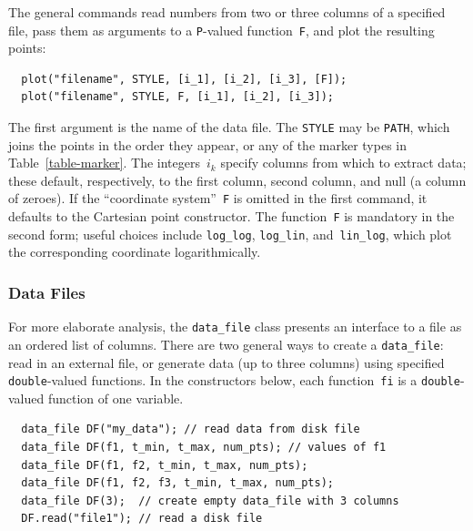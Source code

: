\documentclass[12pt,letterpaper]{book}
\newcommand{\code}[1]{\texttt{#1}}
\newcommand{\teximath}[1]{$#1$}
\newcommand{\findex}[1]{\ignorespaces}
\begin{document}
The general commands read numbers from two or three columns of a
specified file, pass them as arguments to a \code{P}-valued
function~\code{F}, and plot the resulting points:
\findex{plot}
\begin{verbatim}
  plot("filename", STYLE, [i_1], [i_2], [i_3], [F]);
  plot("filename", STYLE, F, [i_1], [i_2], [i_3]);
\end{verbatim}
The first argument is the name of the data file. The \code{STYLE} may
be \code{PATH}, which joins the points in the order they appear, or
any of the marker types in Table~\ref{table-marker}.  The
integers~\teximath{i_k} specify columns from which to extract data; these
default, respectively, to the first column, second column, and null (a
column of zeroes). If the ``coordinate system''~\code{F} is omitted in
the first command, it defaults to the Cartesian point constructor. The
function~\code{F} is mandatory in the second form; useful choices
include \code{log\_log}, \code{log\_lin}, and~\code{lin\_log}, which
plot the corresponding coordinate logarithmically.


\subsubsection*{Data Files}

For more elaborate analysis, the \code{data\_file} class presents an
interface to a file as an ordered list of columns. There are two
general ways to create a \code{data\_file}: read in an external file,
or generate data (up to three columns) using specified
\code{double}-valued functions. In the constructors below, each
function~\code{fi} is a \code{double}-valued function of one variable.
\findex{data\_file}
\findex{data\_file.read}
\begin{verbatim}
  data_file DF("my_data"); // read data from disk file
  data_file DF(f1, t_min, t_max, num_pts); // values of f1
  data_file DF(f1, f2, t_min, t_max, num_pts);
  data_file DF(f1, f2, f3, t_min, t_max, num_pts);
  data_file DF(3);  // create empty data_file with 3 columns
  DF.read("file1"); // read a disk file
\end{verbatim}
\end{document}
